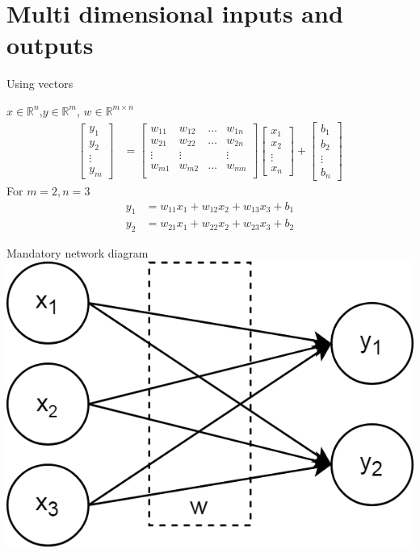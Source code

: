 \section{Multi dimensional inputs and outputs}
\begin{frame}{Using vectors}

		\begin{block}{$x \in \mathbb{R}^n$,$y \in \mathbb{R}^m$, $w\in \mathbb{R}^{m \times n}$}
			\begin{align*}
				\begin{bmatrix}
					y_1 \\
					y_2 \\
					\vdots \\
					y_m
				\end{bmatrix} & =  
				\begin{bmatrix}
					w_{11} & w_{12}& \dots & w_{1n}  \\
					w_{21} & w_{22}& \dots & w_{2n}  \\
					\vdots &\vdots &  & \vdots  \\
					w_{m1} & w_{m2}& \dots & w_{mn}  \\
				\end{bmatrix}
			\begin{bmatrix}
				x_1 \\
				x_2 \\
				\vdots \\
				x_n
			\end{bmatrix} + 
			\begin{bmatrix}
			b_1 \\
			b_2 \\
			\vdots \\
			b_n
			\end{bmatrix}
			\end{align*}
		For $m=2, n=3$
		\begin{align*}
		y_1 &= w_{11}x_1 + w_{12}x_2+w_{13}x_3 + b_1 \\
		y_2 &= w_{21}x_1 + w_{22}x_2+w_{23}x_3 + b_2 
		\end{align*}
		\end{block}
\end{frame}
\begin{frame}{Mandatory network diagram}
	\includegraphics[width=.6\textwidth, center]{figuras/fully_connected_0_layer.png}	
\end{frame}
